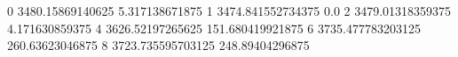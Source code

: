 0 3480.15869140625 5.317138671875
1 3474.841552734375 0.0
2 3479.01318359375 4.171630859375
4 3626.52197265625 151.680419921875
6 3735.477783203125 260.63623046875
8 3723.735595703125 248.89404296875
